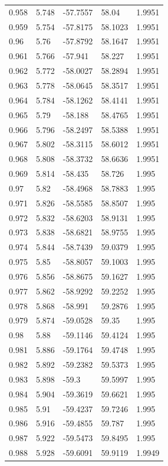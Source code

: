 \begin{tabular}{lllll}
0.958 & 5.748 & -57.7557 & 58.04 & 1.9951 \\
0.959 & 5.754 & -57.8175 & 58.1023 & 1.9951 \\
0.96 & 5.76 & -57.8792 & 58.1647 & 1.9951 \\
0.961 & 5.766 & -57.941 & 58.227 & 1.9951 \\
0.962 & 5.772 & -58.0027 & 58.2894 & 1.9951 \\
0.963 & 5.778 & -58.0645 & 58.3517 & 1.9951 \\
0.964 & 5.784 & -58.1262 & 58.4141 & 1.9951 \\
0.965 & 5.79 & -58.188 & 58.4765 & 1.9951 \\
0.966 & 5.796 & -58.2497 & 58.5388 & 1.9951 \\
0.967 & 5.802 & -58.3115 & 58.6012 & 1.9951 \\
0.968 & 5.808 & -58.3732 & 58.6636 & 1.9951 \\
0.969 & 5.814 & -58.435 & 58.726 & 1.995 \\
0.97 & 5.82 & -58.4968 & 58.7883 & 1.995 \\
0.971 & 5.826 & -58.5585 & 58.8507 & 1.995 \\
0.972 & 5.832 & -58.6203 & 58.9131 & 1.995 \\
0.973 & 5.838 & -58.6821 & 58.9755 & 1.995 \\
0.974 & 5.844 & -58.7439 & 59.0379 & 1.995 \\
0.975 & 5.85 & -58.8057 & 59.1003 & 1.995 \\
0.976 & 5.856 & -58.8675 & 59.1627 & 1.995 \\
0.977 & 5.862 & -58.9292 & 59.2252 & 1.995 \\
0.978 & 5.868 & -58.991 & 59.2876 & 1.995 \\
0.979 & 5.874 & -59.0528 & 59.35 & 1.995 \\
0.98 & 5.88 & -59.1146 & 59.4124 & 1.995 \\
0.981 & 5.886 & -59.1764 & 59.4748 & 1.995 \\
0.982 & 5.892 & -59.2382 & 59.5373 & 1.995 \\
0.983 & 5.898 & -59.3 & 59.5997 & 1.995 \\
0.984 & 5.904 & -59.3619 & 59.6621 & 1.995 \\
0.985 & 5.91 & -59.4237 & 59.7246 & 1.995 \\
0.986 & 5.916 & -59.4855 & 59.787 & 1.995 \\
0.987 & 5.922 & -59.5473 & 59.8495 & 1.995 \\
0.988 & 5.928 & -59.6091 & 59.9119 & 1.9949 \\

\end{tabular}
